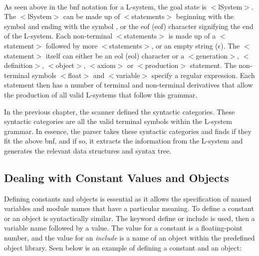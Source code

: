 \begin{singlespace}
\begin{bnf*}
		{}\\
		{}\\
		{\bnfts{==} \bnfor \bnfts{!=} \bnfor \bnfts{$<=$} \bnfor \bnfts{$>=$} \bnfor \bnfts{$>$} \bnfor \bnfts{$<$}}\\
		{}\\
		{\bnfes \bnfor {} }\\
		{}\\
	\end{bnf*}

\newpage

\end{singlespace} 

\noindent
As seen above in the \acrshort{bnf} notation for a L-system, the goal state is $<$lSystem$>$. The $<$lSystem$>$ can be made up of $<$statements$>$ beginning with the symbol \say{\#} and ending with the symbol \say{;}, or the \acrlong{eof} (\acrshort{eof}) character signifying the end of the L-system. Each non-terminal $<$statements$>$ is made up of a $<$statement$>$ followed by more $<$statements$>$, or an empty string ($\epsilon$). The $<$statement$>$ itself can either be an \acrlong{eol} (\acrshort{eol}) character or a $<$generation$>$, $<$definition$>$, $<$object$>$, $<$axiom$>$ or $<$production$>$ statement. The non-terminal symbols $<$float$>$ and $<$variable$>$ specify a regular expression. Each statement then has a number of terminal and non-terminal derivatives that allow the production of all valid L-systems that follow this grammar. 

In the previous chapter, the scanner defined the syntactic categories. These syntactic categories are all the valid terminal symbols within the L-system grammar. In essence, the parser takes these syntactic categories and finds if they fit the above \acrshort{bnf}, and if so, it extracts the information from the L-system and generates the relevant data structures and syntax tree. 

\subsection{Dealing with Constant Values and Objects}

Defining constants and objects is essential as it allows the specification of named variables and module names that have a particular meaning. To define a constant or an object is syntactically similar. The keyword define or include is used, then a variable name followed by a value. The value for a constant is a floating-point number, and the value for an \textit{include} is a name of an object within the predefined object library. Seen below is an example of defining a constant and an object: 

